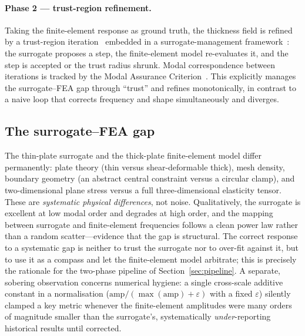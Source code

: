 \documentclass[11pt,a4paper]{article}
\begin{document}
\paragraph{Phase 2 — trust-region refinement.}
Taking the finite-element response as ground truth, the thickness field is refined
by a trust-region iteration~\cite{conn2000} embedded in a surrogate-management
framework~\cite{booker1999}: the surrogate proposes a step, the finite-element
model re-evaluates it, and the step is accepted or the trust radius shrunk. Modal
correspondence between iterations is tracked by the Modal Assurance
Criterion~\cite{allemang1982}. This explicitly manages the surrogate--FEA gap
through ``trust'' and refines monotonically, in contrast to a naive loop that
corrects frequency and shape simultaneously and diverges.

\subsection{The surrogate--FEA gap}\label{sec:gap}
The thin-plate surrogate and the thick-plate finite-element model differ
permanently: plate theory (thin versus shear-deformable thick), mesh density,
boundary geometry (an abstract central constraint versus a circular clamp), and
two-dimensional plane stress versus a full three-dimensional elasticity tensor.
These are \emph{systematic physical differences}, not noise. Qualitatively, the
surrogate is excellent at low modal order and degrades at high order, and the
mapping between surrogate and finite-element frequencies follows a clean power law
rather than a random scatter---evidence that the gap is structural. The correct
response to a systematic gap is neither to trust the surrogate nor to over-fit
against it, but to use it as a compass and let the finite-element model arbitrate;
this is precisely the rationale for the two-phase pipeline of
Section~\ref{sec:pipeline}. A separate, sobering observation concerns numerical
hygiene: a single cross-scale additive constant in a normalisation
($\text{amp}/(\max(\text{amp})+\varepsilon)$ with a fixed $\varepsilon$) silently
clamped a key metric whenever the finite-element amplitudes were many orders of
magnitude smaller than the surrogate's, systematically \emph{under}-reporting
historical results until corrected.
\end{document}
